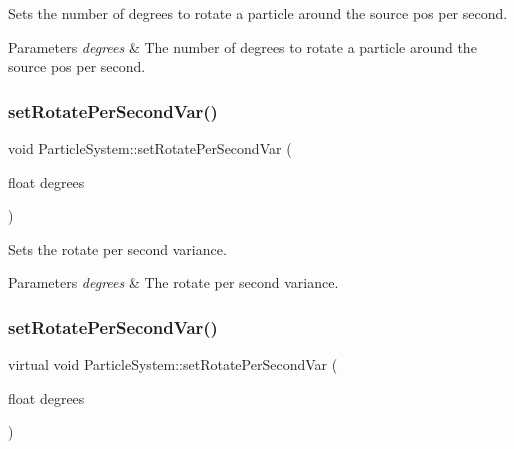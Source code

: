 Sets the number of degrees to rotate a particle around the source pos per second.


\begin{DoxyParams}{Parameters}
{\em degrees} & The number of degrees to rotate a particle around the source pos per second. \\
\hline
\end{DoxyParams}
\mbox{\label{classParticleSystem_a8e9f392f03d1769c4804c258c499b53b}} 
\subsubsection{\texorpdfstring{set\+Rotate\+Per\+Second\+Var()}{setRotatePerSecondVar()}\hspace{0.1cm}{\footnotesize\ttfamily [1/2]}}
{\footnotesize\ttfamily void Particle\+System\+::set\+Rotate\+Per\+Second\+Var (\begin{DoxyParamCaption}\item[{float}]{degrees }\end{DoxyParamCaption})\hspace{0.3cm}{\ttfamily [virtual]}}

Sets the rotate per second variance.


\begin{DoxyParams}{Parameters}
{\em degrees} & The rotate per second variance. \\
\hline
\end{DoxyParams}
\mbox{\label{classParticleSystem_a7ff95cb1df5688f5646475933d3a9291}} 
\subsubsection{\texorpdfstring{set\+Rotate\+Per\+Second\+Var()}{setRotatePerSecondVar()}\hspace{0.1cm}{\footnotesize\ttfamily [2/2]}}
{\footnotesize\ttfamily virtual void Particle\+System\+::set\+Rotate\+Per\+Second\+Var (\begin{DoxyParamCaption}\item[{float}]{degrees }\end{DoxyParamCaption})\hspace{0.3cm}{\ttfamily [virtual]}}

